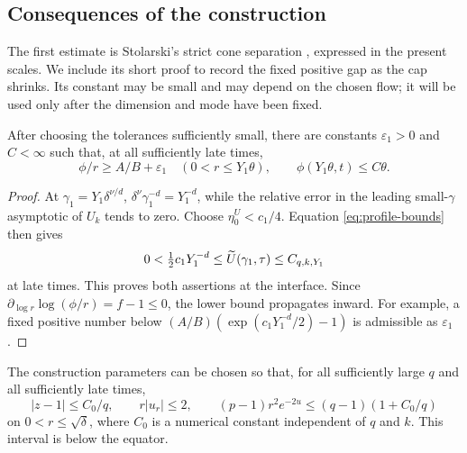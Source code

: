 \subsection{Consequences of the construction}

The first estimate is Stolarski's strict cone separation
\cite[Proposition~5.1(2)]{Stolarski2019}, expressed in the present scales.
We include its short proof to record the fixed positive gap as the cap
shrinks. Its constant may be small and may depend on the chosen flow;
it will be used only after the dimension and mode have been fixed.

\begin{lemma}\label{lem:gap}
After choosing the tolerances sufficiently small, there are constants
\(\varepsilon_1>0\) and \(C<\infty\) such that, at all sufficiently late
times,
\begin{equation}\label{eq:strict-gap}
\phi/r\ge A/B+\varepsilon_1\quad(0<r\le Y_1\theta),
\qquad \phi(Y_1\theta,t)\le C\theta.
\end{equation}
\end{lemma}

\begin{proof}
At \(\gamma_1=Y_1\delta^{\nu/d}\),
\(\delta^\nu\gamma_1^{-d}=Y_1^{-d}\), while the relative error in the
leading small-\(\gamma\) asymptotic of \(U_k\) tends to zero.
Choose \(\eta_0^U<c_1/4\). Equation
\eqref{eq:profile-bounds} then gives
\[
0<\tfrac12c_1Y_1^{-d}\le\widetilde U(\gamma_1,\tau)\le C_{q,k,Y_1}
\]
at late times. This proves both assertions at the interface. Since
\(\partial_{\log r}\log(\phi/r)=f-1\le0\), the lower bound propagates
inward. For example, a fixed positive number below
\((A/B)(\exp(c_1Y_1^{-d}/2)-1)\) is admissible as \(\varepsilon_1\).
\end{proof}

\begin{lemma}\label{lem:uniform}
The construction parameters can be chosen so that, for all sufficiently
large \(q\) and all sufficiently late times,
\begin{equation}\label{eq:uniform}
|z-1|\le C_0/q,\qquad r|u_r|\le2,\qquad
(p-1)r^2e^{-2u}\le(q-1)(1+C_0/q)
\end{equation}
on \(0<r\le\sqrt\delta\), where \(C_0\) is a numerical constant
independent of \(q\) and \(k\). This interval is below the equator.
\end{lemma}

